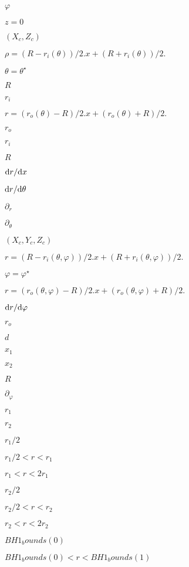 \documentclass{article}
\begin{document}
$\varphi$
\pagebreak

$ z=0 $
\pagebreak

$(X_c, Z_c)$
\pagebreak

$ \rho = (R - r_i(\theta))/2. x + (R + r_i(\theta))/2. $
\pagebreak

$ \theta = \theta^\star $
\pagebreak

$ R $
\pagebreak

$ r_i $
\pagebreak

$ r = (r_o(\theta) - R)/2. x + (r_o(\theta) + R)/2. $
\pagebreak

$ r_o $
\pagebreak

$r_i$
\pagebreak

$ R$
\pagebreak

$ {\rm d} r / {\rm d} x$
\pagebreak

$ {\rm d} r / {\rm d} \theta$
\pagebreak

$ \partial_r $
\pagebreak

$ \partial_\theta $
\pagebreak

$(X_c, Y_c, Z_c)$
\pagebreak

$ r = (R - r_i(\theta, \varphi))/2. x + (R + r_i(\theta, \varphi))/2. $
\pagebreak

$ \varphi = \varphi^\star $
\pagebreak

$ r = (r_o(\theta, \varphi) - R)/2. x + (r_o(\theta, \varphi) + R)/2. $
\pagebreak

$ {\rm d} r / {\rm d} \varphi$
\pagebreak

$r_o$
\pagebreak

$ d $
\pagebreak

$ x_1 $
\pagebreak

$ x_2 $
\pagebreak

$ R $
\pagebreak

$ \partial_\varphi $
\pagebreak

$ r_1 $
\pagebreak

$ r_2 $
\pagebreak

$ r_1/2 $
\pagebreak

$ r_1/2 < r < r_1 $
\pagebreak

$ r_1 < r < 2 r_1 $
\pagebreak

$ r_2/2 $
\pagebreak

$ r_2/2 < r < r_2 $
\pagebreak

$ r_2 < r < 2 r_2 $
\pagebreak

$ BH1_bounds(0) $
\pagebreak

$ BH1_bounds(0) < r < BH1_bounds(1) $
\pagebreak
\end{document}
